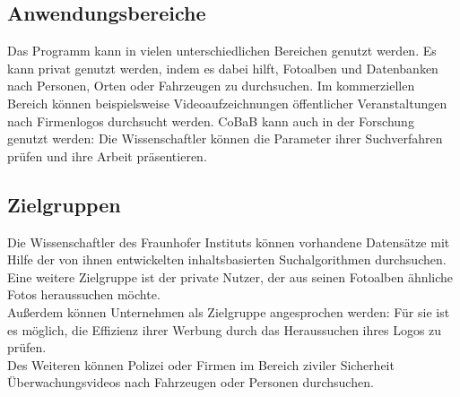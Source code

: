 \subsection{Anwendungsbereiche}

Das Programm kann in vielen unterschiedlichen Bereichen genutzt werden. Es kann privat genutzt werden, indem es dabei hilft, Fotoalben und Datenbanken nach Personen, Orten oder Fahrzeugen zu durchsuchen.
Im kommerziellen Bereich können beispielsweise Videoaufzeichnungen öffentlicher Veranstaltungen nach Firmenlogos durchsucht werden.
CoBaB kann auch in der Forschung genutzt werden: Die Wissenschaftler können die Parameter ihrer Suchverfahren prüfen und ihre Arbeit präsentieren.

\subsection{Zielgruppen}

Die Wissenschaftler des Fraunhofer Instituts können vorhandene Datensätze mit Hilfe der von ihnen entwickelten inhaltsbasierten Suchalgorithmen durchsuchen.\\
Eine weitere Zielgruppe ist der private Nutzer, der aus seinen Fotoalben ähnliche Fotos heraussuchen möchte.\\
Außerdem können Unternehmen als Zielgruppe angesprochen werden: Für sie ist es möglich, die Effizienz ihrer Werbung durch das Heraussuchen ihres Logos zu prüfen.\\
Des Weiteren können Polizei oder Firmen im Bereich ziviler Sicherheit Überwachungsvideos nach Fahrzeugen oder Personen durchsuchen.
\pagebreak
